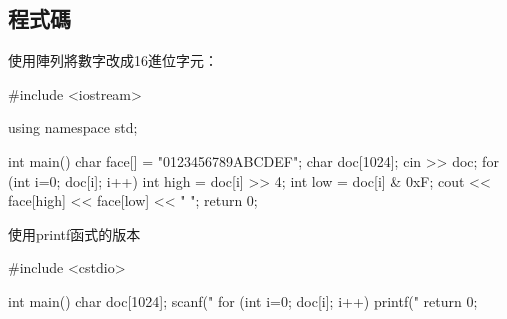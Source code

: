 \subsection{程式碼}
使用陣列將數字改成16進位字元：
\begin{cppcode}
#include <iostream>

using namespace std;

int main() {   
	char face[] = "0123456789ABCDEF";
	char doc[1024];
	cin >> doc;
	for (int i=0; doc[i]; i++) {
		int high = doc[i] >> 4;
		int low = doc[i] & 0xF;
		cout << face[high] << face[low] << " ";
	}
	return 0;
}
\end{cppcode}
使用printf函式的版本
\begin{cppcode}
	#include <cstdio>
	
	int main() {   
		char doc[1024];
		scanf("%
		for (int i=0; doc[i]; i++) {
			printf("%
		}
		return 0;
	}
\end{cppcode}
